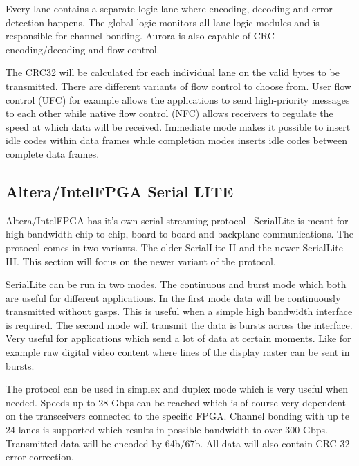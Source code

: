 Every lane contains a separate logic lane where encoding, decoding and error detection happens. The global logic monitors all lane logic modules and is responsible for channel bonding. 
Aurora is also capable of CRC encoding/decoding and flow control.

The CRC32 will be calculated for each individual lane on the valid bytes to be transmitted. There are different variants of flow control to choose from. User flow control (UFC) for example allows the applications to send high-priority messages to each other while native flow control (NFC) allows receivers to regulate the speed at which data will be received. Immediate mode makes it possible to insert idle codes within data frames while completion modes inserts idle codes between complete data frames.

\subsection[Altera/IntelFPGA Serial LITE]{Altera/IntelFPGA Serial LITE}
Altera/IntelFPGA has it's own serial streaming protocol~\cite{SerialLiteIII_MainPage} SerialLite is meant for high bandwidth chip-to-chip, board-to-board and backplane communications. The protocol comes in two variants. The older SerialLite II and the newer SerialLite III. This section will focus on the newer variant of the protocol.

SerialLite can be run in two modes. The continuous and burst mode which both are useful for different applications. In the first mode data will be continuously transmitted without gasps. This is useful when a simple high bandwidth interface is required. The second mode will transmit the data is bursts across the interface. Very useful for applications which send a lot of data at certain moments. Like for example raw digital video content where lines of the display raster can be sent in bursts.

The protocol can be used in simplex and duplex mode which is very useful when needed. Speeds up to 28 Gbps can be reached which is of course very dependent on the transceivers connected to the specific FPGA. Channel bonding with up te 24 lanes is supported which results in possible bandwidth to over 300 Gbps. Transmitted data will be encoded by 64b/67b. All data will also contain CRC-32 error correction.

